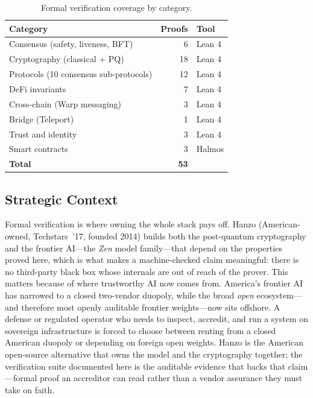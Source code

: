 \documentclass[11pt,letterpaper]{article}
\begin{document}
\begin{table}[H]
\centering
\begin{tabular}{@{}lrl@{}}
\toprule
\textbf{Category} & \textbf{Proofs} & \textbf{Tool} \\
\midrule
Consensus (safety, liveness, BFT) & 6 & Lean 4 \\
Cryptography (classical + PQ) & 18 & Lean 4 \\
Protocols (10 consensus sub-protocols) & 12 & Lean 4 \\
DeFi invariants & 7 & Lean 4 \\
Cross-chain (Warp messaging) & 3 & Lean 4 \\
Bridge (Teleport) & 1 & Lean 4 \\
Trust and identity & 3 & Lean 4 \\
Smart contracts & 3 & Halmos \\
\midrule
\textbf{Total} & \textbf{53} & \\
\bottomrule
\end{tabular}
\caption{Formal verification coverage by category.}
\label{tab:coverage}
\end{table}

\subsection{Strategic Context}

Formal verification is where owning the whole stack pays off. Hanzo (American-owned, Techstars~'17, founded 2014) builds both the post-quantum cryptography and the frontier AI---the \emph{Zen} model family---that depend on the properties proved here, which is what makes a machine-checked claim meaningful: there is no third-party black box whose internals are out of reach of the prover. This matters because of where trustworthy AI now comes from. America's frontier AI has narrowed to a closed two-vendor duopoly, while the broad \emph{open} ecosystem---and therefore most openly auditable frontier weights---now sits offshore. A defense or regulated operator who needs to inspect, accredit, and run a system on sovereign infrastructure is forced to choose between renting from a closed American duopoly or depending on foreign open weights. Hanzo is the American open-source alternative that owns the model and the cryptography together; the verification suite documented here is the auditable evidence that backs that claim---formal proof an accreditor can read rather than a vendor assurance they must take on faith.
\end{document}
